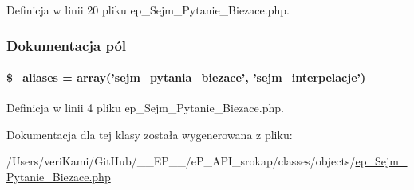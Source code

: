 Definicja w linii 20 pliku ep\-\_\-\-Sejm\-\_\-\-Pytanie\-\_\-\-Biezace.\-php.



\subsubsection{Dokumentacja pól}
\hypertarget{classep___sejm___pytanie___biezace_ab4e31d75f0bc5d512456911e5d01366b}{
\paragraph[{\$\-\_\-aliases}]{\setlength{\rightskip}{0pt plus 5cm}\$\-\_\-aliases = array('sejm\-\_\-pytania\-\_\-biezace', 'sejm\-\_\-interpelacje')}}\label{classep___sejm___pytanie___biezace_ab4e31d75f0bc5d512456911e5d01366b}


Definicja w linii 4 pliku ep\-\_\-\-Sejm\-\_\-\-Pytanie\-\_\-\-Biezace.\-php.



Dokumentacja dla tej klasy została wygenerowana z pliku\-:\begin{DoxyCompactItemize}
\item 
/\-Users/veri\-Kami/\-Git\-Hub/\-\_\-\-\_\-\-E\-P\-\_\-\-\_\-/e\-P\-\_\-\-A\-P\-I\-\_\-srokap/classes/objects/\hyperlink{ep___sejm___pytanie___biezace_8php}{ep\-\_\-\-Sejm\-\_\-\-Pytanie\-\_\-\-Biezace.\-php}\end{DoxyCompactItemize}
